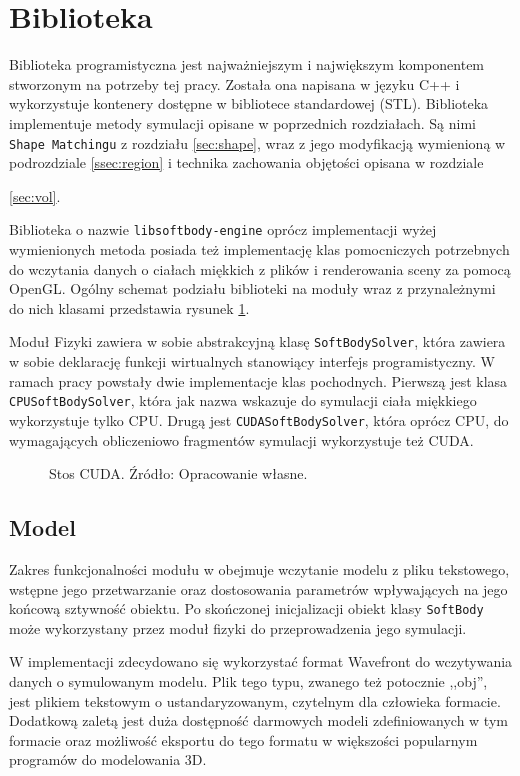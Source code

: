 \section{Biblioteka}
Biblioteka programistyczna jest najważniejszym i największym komponentem
stworzonym na potrzeby tej pracy. Została ona napisana w języku C++ i
wykorzystuje kontenery dostępne w bibliotece standardowej (STL). Biblioteka
implementuje metody symulacji opisane w poprzednich rozdziałach. Są nimi
\texttt{Shape Matchingu} z rozdziału \ref{sec:shape}, wraz z jego modyfikacją
wymienioną w podrozdziale \ref{ssec:region} i technika zachowania objętości
opisana w rozdziale {\ref{sec:vol}. 

Biblioteka o nazwie \texttt{libsoftbody-engine} oprócz implementacji wyżej
wymienionych metoda posiada też implementację klas pomocniczych potrzebnych
do wczytania danych o ciałach miękkich z plików i renderowania sceny za
pomocą OpenGL. Ogólny schemat podziału biblioteki na moduły wraz z
przynależnymi do nich klasami przedstawia rysunek \ref{libsoftbody}.

Moduł Fizyki zawiera w sobie abstrakcyjną klasę \texttt{SoftBodySolver}, która
zawiera w sobie deklarację funkcji wirtualnych stanowiący interfejs
programistyczny. W ramach pracy powstały dwie implementacje klas pochodnych.
Pierwszą jest klasa \texttt{CPUSoftBodySolver}, która jak nazwa wskazuje do
symulacji ciała miękkiego wykorzystuje tylko CPU. Drugą jest
\texttt{CUDASoftBodySolver}, która oprócz CPU, do wymagających obliczeniowo
fragmentów symulacji wykorzystuje też CUDA.

\begin{figure}[H]
\centering

\caption{Stos CUDA. Źródło: Opracowanie własne.}
\label{libsoftbody}
\end{figure}

\subsection{Model}
Zakres funkcjonalności modułu w obejmuje
wczytanie modelu z pliku tekstowego, wstępne jego przetwarzanie oraz
dostosowania parametrów wpływających na jego końcową sztywność obiektu. Po
skończonej inicjalizacji obiekt klasy \texttt{SoftBody} może wykorzystany przez moduł fizyki do
przeprowadzenia jego symulacji.

W implementacji zdecydowano się wykorzystać format Wavefront \cite{obj} do
wczytywania danych o symulowanym modelu. Plik tego typu,
zwanego też potocznie ,,obj'', jest plikiem tekstowym o ustandaryzowanym,
czytelnym dla człowieka formacie. Dodatkową zaletą jest duża dostępność
darmowych modeli zdefiniowanych w tym formacie oraz możliwość eksportu do
tego formatu w większości popularnym programów do modelowania 3D.

}
